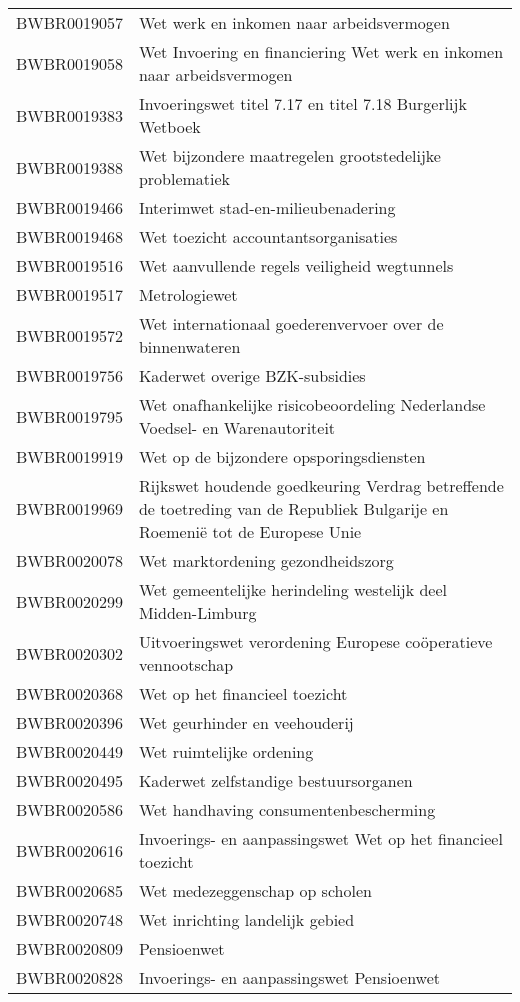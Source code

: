 \begin{longtable}{lp{}}
BWBR0019057 & Wet werk en inkomen naar arbeidsvermogen \\
BWBR0019058 & Wet Invoering en financiering Wet werk en inkomen naar arbeidsvermogen \\
BWBR0019383 & Invoeringswet titel 7.17 en titel 7.18 Burgerlijk Wetboek \\
BWBR0019388 & Wet bijzondere maatregelen grootstedelijke problematiek \\
BWBR0019466 & Interimwet stad-en-milieubenadering  \\
BWBR0019468 & Wet toezicht accountantsorganisaties  \\
BWBR0019516 & Wet aanvullende regels veiligheid wegtunnels  \\
BWBR0019517 & Metrologiewet \\
BWBR0019572 & Wet internationaal goederenvervoer over de binnenwateren \\
BWBR0019756 & Kaderwet overige BZK-subsidies \\
BWBR0019795 & Wet onafhankelijke risicobeoordeling Nederlandse Voedsel- en Warenautoriteit  \\
BWBR0019919 & Wet op de bijzondere opsporingsdiensten \\
BWBR0019969 & Rijkswet houdende goedkeuring Verdrag betreffende de toetreding van de Republiek Bulgarije en Roemenië tot de Europese Unie \\
BWBR0020078 & Wet marktordening gezondheidszorg \\
BWBR0020299 & Wet gemeentelijke herindeling westelijk deel Midden-Limburg \\
BWBR0020302 & Uitvoeringswet verordening Europese coöperatieve vennootschap \\
BWBR0020368 & Wet op het financieel toezicht \\
BWBR0020396 & Wet geurhinder en veehouderij \\
BWBR0020449 & Wet ruimtelijke ordening \\
BWBR0020495 & Kaderwet zelfstandige bestuursorganen \\
BWBR0020586 & Wet handhaving consumentenbescherming \\
BWBR0020616 & Invoerings- en aanpassingswet Wet op het financieel toezicht \\
BWBR0020685 & Wet medezeggenschap op scholen \\
BWBR0020748 & Wet inrichting landelijk gebied \\
BWBR0020809 & Pensioenwet  \\
BWBR0020828 & Invoerings- en aanpassingswet Pensioenwet  \\

\end{longtable}
